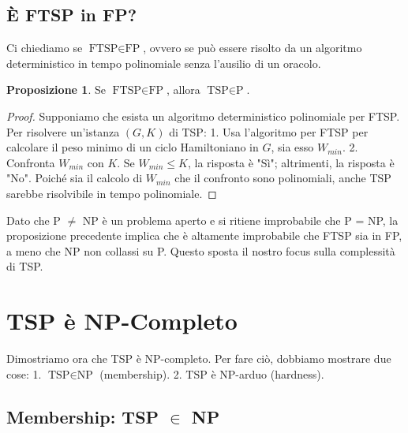 \documentclass[a4paper]{article}
\theoremstyle{definition} %
\newtheorem{proposition}{Proposizione}
\begin{document}
\subsection{È FTSP in FP?}

Ci chiediamo se $\text{FTSP} \in \text{FP}$, ovvero se può essere risolto da un algoritmo deterministico in tempo polinomiale senza l'ausilio di un oracolo.

\begin{proposition}
Se $\text{FTSP} \in \text{FP}$, allora $\text{TSP} \in \text{P}$.
\end{proposition}
\begin{proof}
Supponiamo che esista un algoritmo deterministico polinomiale per FTSP. Per risolvere un'istanza $(G, K)$ di TSP:
1.  Usa l'algoritmo per FTSP per calcolare il peso minimo di un ciclo Hamiltoniano in $G$, sia esso $W_{min}$.
2.  Confronta $W_{min}$ con $K$. Se $W_{min} \le K$, la risposta è "Sì"; altrimenti, la risposta è "No".
Poiché sia il calcolo di $W_{min}$ che il confronto sono polinomiali, anche TSP sarebbe risolvibile in tempo polinomiale.
\end{proof}

Dato che P $\neq$ NP è un problema aperto e si ritiene improbabile che P = NP, la proposizione precedente implica che è altamente improbabile che FTSP sia in FP, a meno che NP non collassi su P. Questo sposta il nostro focus sulla complessità di TSP.

\section{TSP è NP-Completo}

Dimostriamo ora che TSP è NP-completo. Per fare ciò, dobbiamo mostrare due cose:
1.  $\text{TSP} \in \text{NP}$ (membership).
2.  $\text{TSP}$ è $\text{NP}$-arduo (hardness).

\subsection{Membership: TSP $\in$ NP}
\end{document}
